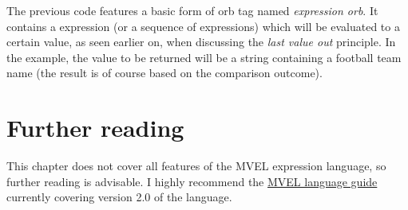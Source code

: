 The previous code features a basic form of orb tag named \emph{expression orb}. It contains a expression (or a sequence of expressions) which will be evaluated to a certain value, as seen earlier on, when discussing the \emph{last value out} principle. In the example, the value to be returned will be a string containing a football team name (the result is of course based on the comparison outcome).

\section{Further reading}
\label{sec:mvelfurtherreading}

This chapter does not cover all features of the MVEL expression language, so further reading is advisable. I highly recommend the \href{http://mvel.documentnode.com/}{MVEL language guide} currently covering version 2.0 of the language.